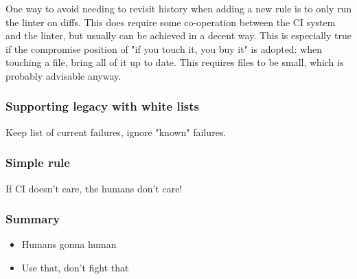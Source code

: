 One way to avoid needing to revisit history when adding a new rule
is to only run the linter on diffs.
This does require some co-operation between the CI system
and the linter,
but usually can be achieved in a decent way.
This is especially true if the compromise position of
"if you touch it, you buy it"
is adopted:
when touching a file,
bring all of it up to date.
This requires files to be small,
which is probably advisable anyway.

\begin{frame}
\frametitle{Supporting legacy with white lists}
Keep list of current failures,
ignore "known" failures.
\end{frame}

\begin{frame}
\frametitle{Simple rule}
If CI doesn't care,
the humans don't care!
\end{frame}

\begin{frame}
\frametitle{Summary}
\begin{itemize}
\item Humans gonna human
\item Use that, don't fight that
\end{itemize}
\end{frame}


